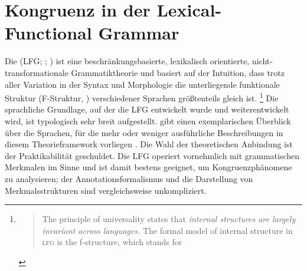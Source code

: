 \section{Kongruenz in der Lexical-Functional Grammar}
\label{sec:lfgkongr}

Die  (LFG;
\cites{kaplanbresnan1982,bresnan2001,bresnanetal2016}; \cites[zur Einführung
vgl.\ z.\,B.][]{buttking2015}[Kapitel~7]{mueller2020}) ist eine
beschränkungsbasierte, lexikalisch orientierte, nicht-transformationale
Grammatiktheorie und basiert auf der Intuition, dass trotz aller Variation in
der Syntax und Morphologie die unterliegende funktionale Struktur (F-Struktur,
) verschiedener Sprachen größtenteils gleich ist.%
%
	\footnote{\foreignblockcquote{english}[42]{bresnanetal2016}{The principle
		of universality states that \emph{internal structures are largely
		invariant across languages.} The formal model of internal structure in
		\textsc{lfg} is the f-structure, which stands for }.%
	}
%
Die sprachliche Grundlage, auf der die LFG entwickelt wurde und
weiterentwickelt wird, ist typologisch sehr breit aufgestellt.
\citet[221--222]{mueller2020} gibt einen exemplarischen Überblick über die
Sprachen, für die mehr oder weniger ausführliche Beschreibungen in diesem
Theorieframework vorliegen \autocites[zum modernen Standarddeutschen
vgl.][]{berman2003}{fortmann2006}. Die Wahl der theoretischen Anbindung ist der
Praktikabilität geschuldet. Die LFG operiert vornehmlich mit grammatischen
Merkmalen im Sinne  und ist damit bestens geeignet, um Kongruenzphänomene zu analysieren; der Annotationsformalismus und die
Darstellung von Merkmalsstrukturen sind vergleichsweise unkompliziert.%

